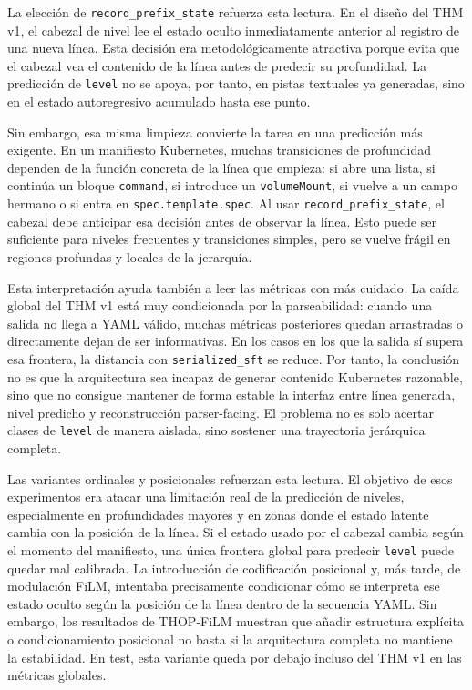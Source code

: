 La elección de \texttt{record\_prefix\_state} refuerza esta lectura. En el diseño del THM v1,
el cabezal de nivel lee el estado oculto inmediatamente anterior al registro de una nueva
línea. Esta decisión era metodológicamente atractiva porque evita que el cabezal vea el
contenido de la línea antes de predecir su profundidad. La predicción de \texttt{level} no se
apoya, por tanto, en pistas textuales ya generadas, sino en el estado autoregresivo acumulado
hasta ese punto.

Sin embargo, esa misma limpieza convierte la tarea en una predicción más exigente. En un
manifiesto Kubernetes, muchas transiciones de profundidad dependen de la función concreta de
la línea que empieza: si abre una lista, si continúa un bloque \texttt{command}, si introduce
un \texttt{volumeMount}, si vuelve a un campo hermano o si entra en
\texttt{spec.template.spec}. Al usar \texttt{record\_prefix\_state}, el cabezal debe anticipar
esa decisión antes de observar la línea. Esto puede ser suficiente para niveles frecuentes y
transiciones simples, pero se vuelve frágil en regiones profundas y locales de la jerarquía.

Esta interpretación ayuda también a leer las métricas con más cuidado. La caída global del
THM v1 está muy condicionada por la parseabilidad: cuando una salida no llega a YAML válido,
muchas métricas posteriores quedan arrastradas o directamente dejan de ser informativas. En
los casos en los que la salida sí supera esa frontera, la distancia con \texttt{serialized\_sft}
se reduce. Por tanto, la conclusión no es que la arquitectura sea incapaz de generar contenido
Kubernetes razonable, sino que no consigue mantener de forma estable la interfaz entre línea
generada, nivel predicho y reconstrucción parser-facing. El problema no es solo acertar clases
de \texttt{level} de manera aislada, sino sostener una trayectoria jerárquica completa.

Las variantes ordinales y posicionales refuerzan esta lectura. El objetivo de esos
experimentos era atacar una limitación real de la predicción de niveles, especialmente en
profundidades mayores y en zonas donde el estado latente cambia con la posición de la
línea. Si el estado usado por el cabezal cambia según el momento
del manifiesto, una única frontera global para predecir \texttt{level} puede quedar mal
calibrada. La introducción de codificación posicional y, más tarde, de modulación FiLM,
intentaba precisamente condicionar cómo se interpreta ese estado oculto según la posición de
la línea dentro de la secuencia YAML. Sin embargo, los resultados de THOP-FiLM muestran que
añadir estructura explícita o condicionamiento posicional no basta si la arquitectura completa
no mantiene la estabilidad. En test, esta variante queda por debajo incluso del
THM v1 en las métricas globales.

